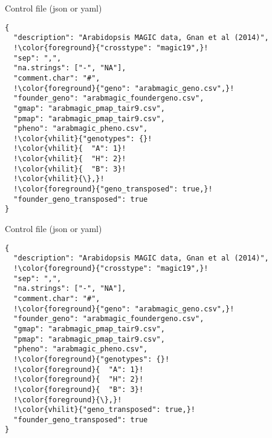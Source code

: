 \documentclass[12pt,t,aspectratio=169]{beamer}
\begin{document}
\begin{frame}[c,fragile]{Control file (json or yaml)}
\addtocounter{framenumber}{-1}
\begin{semiverbatim} \begin{lstlisting}[escapechar=!]
{
  "description": "Arabidopsis MAGIC data, Gnan et al (2014)",
  !\color{foreground}{"crosstype": "magic19",}!
  "sep": ",",
  "na.strings": ["-", "NA"],
  "comment.char": "#",
  !\color{foreground}{"geno": "arabmagic_geno.csv",}!
  "founder_geno": "arabmagic_foundergeno.csv",
  "gmap": "arabmagic_pmap_tair9.csv",
  "pmap": "arabmagic_pmap_tair9.csv",
  "pheno": "arabmagic_pheno.csv",
  !\color{vhilit}{"genotypes": {}!
  !\color{vhilit}{  "A": 1}!
  !\color{vhilit}{  "H": 2}!
  !\color{vhilit}{  "B": 3}!
  !\color{vhilit}{\},}!
  !\color{foreground}{"geno_transposed": true,}!
  "founder_geno_transposed": true
}
\end{lstlisting} \end{semiverbatim}
\end{frame}



\begin{frame}[c,fragile]{Control file (json or yaml)}
\addtocounter{framenumber}{-1}
\begin{semiverbatim} \begin{lstlisting}[escapechar=!]
{
  "description": "Arabidopsis MAGIC data, Gnan et al (2014)",
  !\color{foreground}{"crosstype": "magic19",}!
  "sep": ",",
  "na.strings": ["-", "NA"],
  "comment.char": "#",
  !\color{foreground}{"geno": "arabmagic_geno.csv",}!
  "founder_geno": "arabmagic_foundergeno.csv",
  "gmap": "arabmagic_pmap_tair9.csv",
  "pmap": "arabmagic_pmap_tair9.csv",
  "pheno": "arabmagic_pheno.csv",
  !\color{foreground}{"genotypes": {}!
  !\color{foreground}{  "A": 1}!
  !\color{foreground}{  "H": 2}!
  !\color{foreground}{  "B": 3}!
  !\color{foreground}{\},}!
  !\color{vhilit}{"geno_transposed": true,}!
  "founder_geno_transposed": true
}
\end{lstlisting} \end{semiverbatim}
\end{frame}
\end{document}
